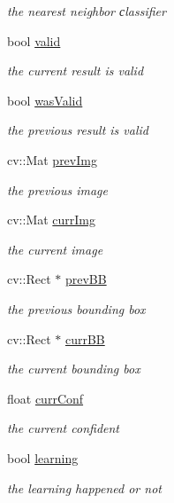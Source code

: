 \begin{DoxyCompactItemize}
\begin{DoxyCompactList}\small\item\em the nearest neighbor сlassifier \end{DoxyCompactList}\item 
bool \hyperlink{classtld_1_1TLD_a2a238338a62dac450b2759f99d5ae304}{valid}
\begin{DoxyCompactList}\small\item\em the current result is valid \end{DoxyCompactList}\item 
bool \hyperlink{classtld_1_1TLD_a26e0c624178eb37a57cd0146efa6d262}{was\-Valid}
\begin{DoxyCompactList}\small\item\em the previous result is valid \end{DoxyCompactList}\item 
cv\-::\-Mat \hyperlink{classtld_1_1TLD_a7b402ff7a0260f00b8d3dbcea5c87efa}{prev\-Img}
\begin{DoxyCompactList}\small\item\em the previous image \end{DoxyCompactList}\item 
cv\-::\-Mat \hyperlink{classtld_1_1TLD_a7bb2c3271567719afb2f97e5953c31d5}{curr\-Img}
\begin{DoxyCompactList}\small\item\em the current image \end{DoxyCompactList}\item 
cv\-::\-Rect $\ast$ \hyperlink{classtld_1_1TLD_adc7a217f04d600daffe8d025f424677f}{prev\-B\-B}
\begin{DoxyCompactList}\small\item\em the previous bounding box \end{DoxyCompactList}\item 
cv\-::\-Rect $\ast$ \hyperlink{classtld_1_1TLD_a5af4bc9d8fa64c4423b294f727c4ba55}{curr\-B\-B}
\begin{DoxyCompactList}\small\item\em the current bounding box \end{DoxyCompactList}\item 
float \hyperlink{classtld_1_1TLD_ab2e815db72cb2f40a7864c4d4457eb34}{curr\-Conf}
\begin{DoxyCompactList}\small\item\em the current confident \end{DoxyCompactList}\item 
bool \hyperlink{classtld_1_1TLD_a0f108af012bc9b7d004bed33cf8e4d90}{learning}
\begin{DoxyCompactList}\small\item\em the learning happened or not \end{DoxyCompactList}\end{DoxyCompactItemize}
